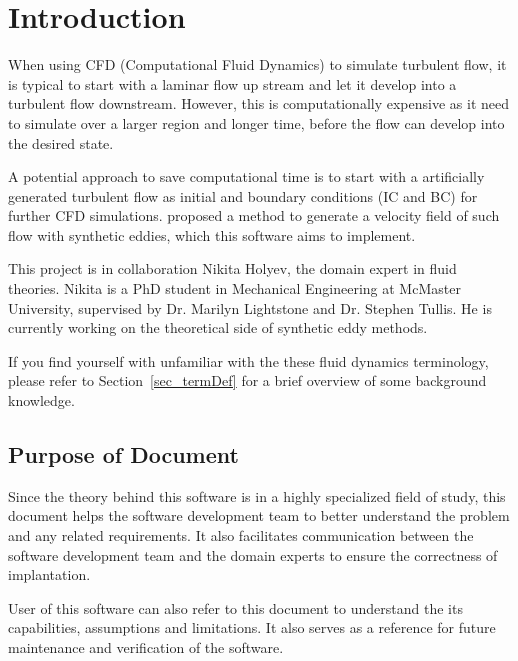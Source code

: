 \documentclass[12pt]{article}
\begin{document}
\section{Introduction}
When using CFD (Computational Fluid Dynamics) to simulate turbulent flow, it is typical to start with a laminar flow up stream and let it develop into a turbulent flow downstream. However, this is computationally expensive as it need to simulate over a larger region and longer time, before the flow can develop into the desired state. 

A potential approach to save computational time is to start with a artificially generated turbulent flow as initial and boundary conditions (IC and BC) for further CFD simulations. \citet{PolettoEtAl2013} proposed a method to generate a velocity field of such flow with synthetic eddies, which this software aims to implement.

This project is in collaboration Nikita Holyev, the domain expert in fluid theories. Nikita is a PhD student in Mechanical Engineering at McMaster University, supervised by Dr. Marilyn Lightstone and Dr. Stephen Tullis. He is currently working on the theoretical side of synthetic eddy methods.

If you find yourself with unfamiliar with the these fluid dynamics terminology, please refer to Section~\ref{sec_termDef} for a brief overview of some background knowledge.

\subsection{Purpose of Document}
Since the theory behind this software is in a highly specialized field of study, this document helps the software development team to better understand the problem and any related requirements. It also facilitates communication between the software development team and the domain experts to ensure the correctness of implantation.

User of this software can also refer to this document to understand the its capabilities, assumptions and limitations. It also serves as a reference for future maintenance and verification of the software.
\end{document}
